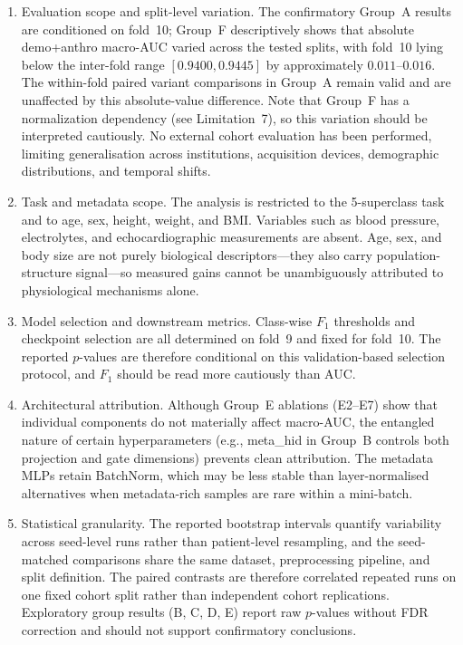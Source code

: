 \documentclass[mathematics,article,submit,pdftex]{Definitions/mdpi}
\def\texttt#1{#1}%
\def\textbf#1{#1}%
\begin{document}
\begin{enumerate}[leftmargin=1.4em]
    \item \textbf{Evaluation scope and split-level variation.} The confirmatory Group~A results are conditioned on fold~10; Group~F descriptively shows that absolute \texttt{demo+anthro} macro-AUC varied across the tested splits, with fold~10 lying below the inter-fold range $[0.9400, 0.9445]$ by approximately $0.011$--$0.016$. The within-fold paired variant comparisons in Group~A remain valid and are unaffected by this absolute-value difference. Note that Group~F has a normalization dependency (see Limitation~7), so this variation should be interpreted cautiously. No external cohort evaluation has been performed, limiting generalisation across institutions, acquisition devices, demographic distributions, and temporal shifts.
    \item \textbf{Task and metadata scope.} The analysis is restricted to the 5-superclass task and to age, sex, height, weight, and BMI. Variables such as blood pressure, electrolytes, and echocardiographic measurements are absent. Age, sex, and body size are not purely biological descriptors---they also carry population-structure signal---so measured gains cannot be unambiguously attributed to physiological mechanisms alone.
    \item \textbf{Model selection and downstream metrics.} Class-wise $F_1$ thresholds and checkpoint selection are all determined on fold~9 and fixed for fold~10. The reported $p$-values are therefore conditional on this validation-based selection protocol, and $F_1$ should be read more cautiously than AUC.
    \item \textbf{Architectural attribution.} Although Group~E ablations (E2--E7) show that individual components do not materially affect macro-AUC, the entangled nature of certain hyperparameters (e.g., \texttt{meta\_hid} in Group~B controls both projection and gate dimensions) prevents clean attribution. The metadata MLPs retain BatchNorm, which may be less stable than layer-normalised alternatives when metadata-rich samples are rare within a mini-batch.
    \item \textbf{Statistical granularity.} The reported bootstrap intervals quantify variability across seed-level runs rather than patient-level resampling, and the seed-matched comparisons share the same dataset, preprocessing pipeline, and split definition. The paired contrasts are therefore correlated repeated runs on one fixed cohort split rather than independent cohort replications. Exploratory group results (B, C, D, E) report raw $p$-values without FDR correction and should not support confirmatory conclusions.

\end{enumerate}
\end{document}
